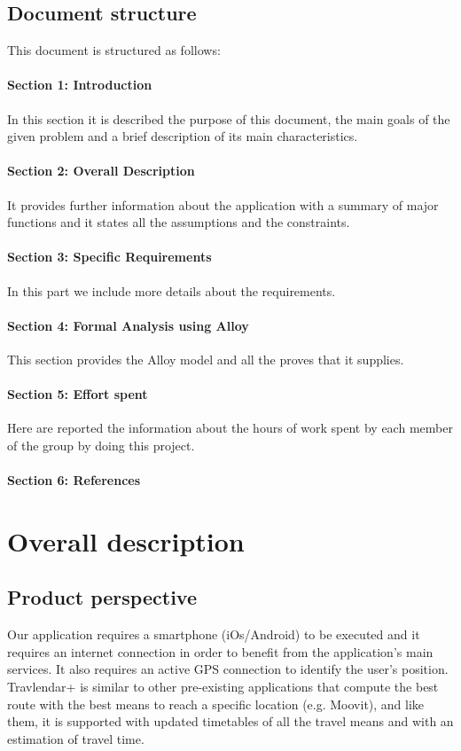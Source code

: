 \documentclass[12pt,titlepage]{article}
\begin{document}
\subsection{Document structure}\label{RASD}
This document is structured as follows:
\paragraph{Section 1: Introduction}
In this section it is described the purpose of this document, the main goals of the given problem and a brief description of its main characteristics. 
\paragraph{Section 2: Overall Description}
It provides further information about the application with a summary of major functions and it states all the assumptions and the constraints.
\paragraph{Section 3: Specific Requirements}
In this part we include more details about the requirements.
\paragraph{Section 4: Formal Analysis using Alloy}
This section provides the Alloy model and all the proves that it supplies.
\paragraph{Section 5: Effort spent}
Here are reported the information about the hours of work spent by each member of the group by doing this project.
\paragraph{Section 6: References}
\pagebreak

\section{Overall description}\label{sec:crit}

\subsection{Product perspective}\label{sec:mod1}
Our application requires a smartphone (iOs/Android) to be executed and it requires an internet connection in order to benefit from the application's main services.
It also requires an active GPS connection to identify the user's position. 
Travlendar+ is similar to other pre-existing applications that compute the best route with the best means to reach a specific location (e.g. Moovit), and like them, it is supported with updated timetables of all the travel means and with an estimation of travel time. 
\end{document}
